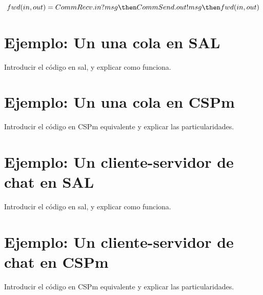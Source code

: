 \[
  fwd(in, out) = CommRecv.in?msg \then CommSend.out!msg \then fwd(in, out)
\]


\section{Ejemplo: Un una cola en SAL}

Introducir el código en sal, y explicar como funciona.

\section{Ejemplo: Un una cola en CSPm}

Introducir el código en CSPm equivalente y explicar las particularidades.

\section{Ejemplo: Un cliente-servidor de chat en SAL}

Introducir el código en sal, y explicar como funciona.

\section{Ejemplo: Un cliente-servidor de chat en CSPm}

Introducir el código en CSPm equivalente y explicar las particularidades.
